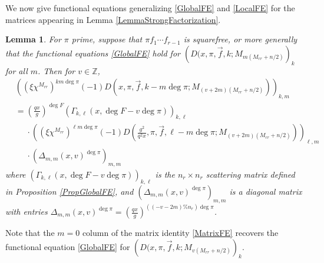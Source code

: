 \documentclass[11pt,letterpaper]{article}
\newtheorem{lemma}[theorem]{Lemma}
\theoremstyle{definition}
\theoremstyle{remark}
\numberwithin{equation}{section}
\theoremstyle{dotless}
\newcommand{\Z}{\mathbb{Z}}
\begin{document}
We now give functional equations generalizing \eqref{GlobalFE} and \eqref{LocalFE} for the matrices appearing in Lemma \ref{LemmaStrongFactorization}. 

\begin{lemma}\label{LemmaMatrixFE}
For $\pi$ prime, suppose that $\pi f_1\cdots f_{r-1}$ is squarefree, or more generally that the functional equations \eqref{GlobalFE} hold for $\left(D(x, \pi, \vec{f}, k; M_{m(M_{rr}+n/2)} \right)_k$ for all $m$. Then for $v \in \Z$,
\begin{equation}\label{MatrixFE}
\begin{split}
&\left( (\xi \chi^{M_{rr}})^{k m \deg \pi}(-1)D(x, \pi, \vec{f}, k-m\deg \pi; M_{(v+2m)(M_{rr}+n/2)}) \right)_{k,m} \\
&= \left( \frac{qx}{g} \right)^{\deg F} \left( \Gamma_{k, \ell}(x, \deg F - v \deg \pi) \right)_{k, \ell} \\
& \phantom{=}\cdot \left( (\xi \chi^{M_{rr}})^{\ell m \deg \pi}(-1)  D\left(\frac{g^2}{q^2x}, \pi, \vec{f}, \ell-m\deg \pi; M_{(v+2m)(M_{rr}+n/2)} \right) \right)_{\ell, m} \\
& \phantom{=}\cdot \left(\Delta_{m,m}(x, v)^{\deg \pi} \right)_{m,m} 
\end{split}
\end{equation}
where $\left( \Gamma_{k, \ell}(x, \deg F - v\deg \pi) \right)_{k, \ell}$ is the $n_r \times n_r$ scattering matrix defined in Proposition \ref{PropGlobalFE}, and $\left(\Delta_{m,m}(x,v)^{\deg \pi} \right)_{m,m}$ is a diagonal matrix with entries $\Delta_{m,m}(x,v)^{\deg \pi}=\left(\frac{qx}{g}\right)^{((-v-2m)\% n_r)\deg \pi}$.
\end{lemma}
Note that the $m=0$ column of the matrix identity \eqref{MatrixFE} recovers the functional equation \eqref{GlobalFE} for $\left(D(x, \pi, \vec{f}, k; M_{v(M_{rr}+n/2)} \right)_k$. 
\end{document}
